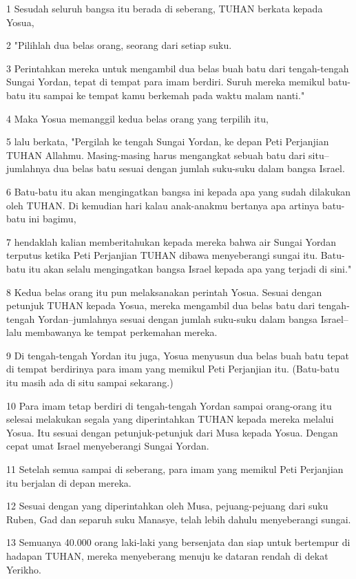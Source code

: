 \par 1 Sesudah seluruh bangsa itu berada di seberang, TUHAN berkata kepada Yosua,
\par 2 "Pilihlah dua belas orang, seorang dari setiap suku.
\par 3 Perintahkan mereka untuk mengambil dua belas buah batu dari tengah-tengah Sungai Yordan, tepat di tempat para imam berdiri. Suruh mereka memikul batu-batu itu sampai ke tempat kamu berkemah pada waktu malam nanti."
\par 4 Maka Yosua memanggil kedua belas orang yang terpilih itu,
\par 5 lalu berkata, "Pergilah ke tengah Sungai Yordan, ke depan Peti Perjanjian TUHAN Allahmu. Masing-masing harus mengangkat sebuah batu dari situ--jumlahnya dua belas batu sesuai dengan jumlah suku-suku dalam bangsa Israel.
\par 6 Batu-batu itu akan mengingatkan bangsa ini kepada apa yang sudah dilakukan oleh TUHAN. Di kemudian hari kalau anak-anakmu bertanya apa artinya batu-batu ini bagimu,
\par 7 hendaklah kalian memberitahukan kepada mereka bahwa air Sungai Yordan terputus ketika Peti Perjanjian TUHAN dibawa menyeberangi sungai itu. Batu-batu itu akan selalu mengingatkan bangsa Israel kepada apa yang terjadi di sini."
\par 8 Kedua belas orang itu pun melaksanakan perintah Yosua. Sesuai dengan petunjuk TUHAN kepada Yosua, mereka mengambil dua belas batu dari tengah-tengah Yordan--jumlahnya sesuai dengan jumlah suku-suku dalam bangsa Israel--lalu membawanya ke tempat perkemahan mereka.
\par 9 Di tengah-tengah Yordan itu juga, Yosua menyusun dua belas buah batu tepat di tempat berdirinya para imam yang memikul Peti Perjanjian itu. (Batu-batu itu masih ada di situ sampai sekarang.)
\par 10 Para imam tetap berdiri di tengah-tengah Yordan sampai orang-orang itu selesai melakukan segala yang diperintahkan TUHAN kepada mereka melalui Yosua. Itu sesuai dengan petunjuk-petunjuk dari Musa kepada Yosua. Dengan cepat umat Israel menyeberangi Sungai Yordan.
\par 11 Setelah semua sampai di seberang, para imam yang memikul Peti Perjanjian itu berjalan di depan mereka.
\par 12 Sesuai dengan yang diperintahkan oleh Musa, pejuang-pejuang dari suku Ruben, Gad dan separuh suku Manasye, telah lebih dahulu menyeberangi sungai.
\par 13 Semuanya 40.000 orang laki-laki yang bersenjata dan siap untuk bertempur di hadapan TUHAN, mereka menyeberang menuju ke dataran rendah di dekat Yerikho.
